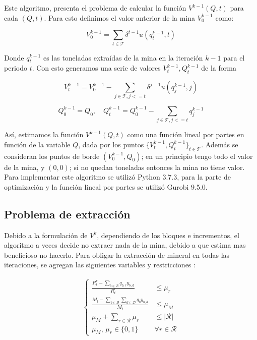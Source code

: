 \documentclass[12pt,letterpaper]{article}
\newcommand{\abs}[1]{\left| #1 \right|}
\newcommand\mB{\mathcal{B}}
\newcommand\mD{\mathcal{D}}
\newcommand\mT{\mathcal{T}}
\newcommand\mR{\mathcal{R}}
\begin{document}
Este algoritmo, presenta el problema de calcular la función $V^{k-1}(Q,t)$ para cada $(Q,t)$. Para esto definimos el valor anterior de la mina $V^{k-1}_0$ como:

$$ V^{k-1}_0 = \sum_{t \in \mT} \delta^{t-1} u(q^{k-1}_{t},t)$$

Donde $q^{k-1}_{t}$ es las toneladas extraídas de la mina en la iteración $k-1$ para el periodo $t$. Con esto generamos una serie de valores $V^{k-1}_t,Q^{k-1}_t$ de la forma

$$  V^{k-1}_t =  V^{k-1}_0 - \sum_{j \in \mT, j <= t} \delta^{j-1} u(q^{k-1}_{j},j) $$

$$Q^{k-1}_0 = Q_0, \quad  Q^{k-1}_t =  Q^{k-1}_0 - \sum_{j \in \mT, j <= t} q^{k-1}_{j}$$

Así, estimamos la función $V^{k-1}(Q,t)$ como una función lineal por partes en función de la variable $Q$, dada por los puntos $\{V^{k-1}_t,Q^{k-1}_t\}_{t \in \mT}$. Además se consideran los puntos de borde $(V^{k-1}_0,Q_0)$; en un principio tengo todo el valor de la mina, y $(0,0)$; si no quedan toneladas entonces la mina no tiene valor. \\

Para implementar este algoritmo se utilizó Python 3.7.3, para la parte de optimización y la función lineal por partes se utilizó Gurobi 9.5.0. 


\subsection{Problema de extracción}

Debido a la formulación de $V^k$, dependiendo de los bloques e incrementos, el algoritmo a veces decide no extraer nada de la mina, debido a que estima mas beneficioso no hacerlo. Para obligar la extracción de mineral en todas las iteraciones, se agregan las siguientes variables y restricciones :

\begin{align*}
\begin{cases}
\frac{R_t^r-\sum\limits_{b \in \mB} q_{b,r}y_{b,d}}{R_t^r} &\leq \mu_r \\
\frac{M_t- \sum \limits_{b\in \mB}\sum\limits_{ d \in \mD} q_b y_{b,d}}{M_t} &\leq  \mu_M\\
\mu_M + \sum\limits_{r\in \mR} \mu_r &\leq  \abs{\mR}\\
\mu_M, \, \mu_r \in \{0,1\} &\forall r \in \mR
\end{cases}
\end{align*}
\end{document}
